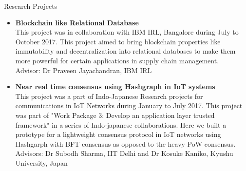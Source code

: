 \documentclass{resume} %
\begin{document}
\begin{rSection}{Research Projects}
\begin{itemize}
\item \textbf{Blockchain like Relational Database}\\
 This project was in collaboration with IBM IRL, Bangalore during July to October 2017. This project aimed to bring blockchain properties like immutability and decentralization into relational databases to make them more powerful for certain applications in supply chain management.\\
 Advisor: Dr Praveen Jayachandran, IBM IRL

\item \textbf{Near real time consensus using Hashgraph in IoT systems}\\
This project was a part of Indo-Japanese Research projects for communications in IoT Networks during January to July 2017. This project was part of "Work Package 3: Develop an application layer trusted framework" in a series of Indo-japanese collaborations. Here we built a prototype for a lightweight consensus protocol in IoT networks using Hashgarph with BFT consensus as opposed to the heavy PoW consensus.\\
Advisors: Dr Subodh Sharma, IIT Delhi and Dr Kosuke Kaniko, Kyushu University, Japan



\end{itemize}
\end{rSection}
\end{document}
